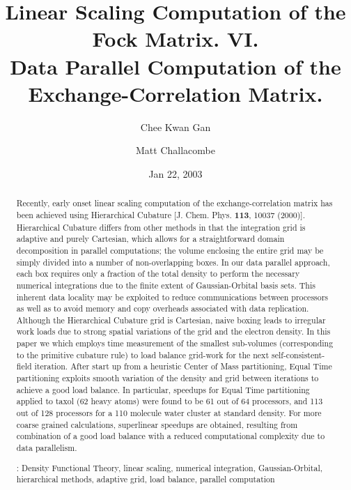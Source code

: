 \commentoutA{\documentclass[prl,aps,twocolumn,showpacs,twocolumngrid,superbib]{revtex4}}
\begin{document}
\title[Short Title]{ Linear Scaling Computation of the Fock Matrix. VI. \\ 
                     Data Parallel Computation of the Exchange-Correlation Matrix.\footnotemark[4] }

\author{Chee Kwan Gan\footnotemark[2]}
\author{Matt Challacombe\footnotemark[3]}
 


\date{Jan 22, 2003}

\begin{abstract}
Recently, early onset linear scaling computation of the
exchange-correlation matrix has been achieved using Hierarchical
Cubature [J. Chem. Phys. {\bf 113}, 10037 (2000)]. Hierarchical
Cubature differs from other methods in that the integration grid is
adaptive and purely Cartesian, which allows for a straightforward
domain decomposition in parallel computations; the volume enclosing
the entire grid may be simply divided into a number of non-overlapping
boxes. In our data parallel approach, each box requires only a fraction 
of the total density to perform the necessary numerical integrations
due to the finite extent of Gaussian-Orbital basis sets.  This inherent 
data locality may be exploited to reduce communications between processors 
as well as to avoid memory and copy overheads associated with data 
replication.  Although the Hierarchical Cubature grid is Cartesian, 
naive boxing leads to irregular work loads due to strong spatial variations 
of the grid and the electron density.  In this paper we
which employs time measurement of the smallest sub-volumes
(corresponding to the primitive cubature rule) to load balance
grid-work for the next self-consistent-field iteration.  After start
up from a heuristic Center of Mass partitioning, Equal Time
partitioning exploits smooth variation of the density and grid between
iterations to achieve a good load balance. In particular, speedups for
Equal Time partitioning applied to taxol (62 heavy atoms) were found
to be 61 out of 64 processors, and 113 out of 128 processors for a 110
molecule water cluster at standard density.  For more coarse grained
calculations, superlinear speedups are obtained, resulting from
combination of a good load balance with a reduced computational
complexity due to data parallelism.

\smallskip
{}: Density Functional Theory, linear scaling, numerical integration, Gaussian-Orbital, 
                         hierarchical methods, adaptive grid, load balance, parallel computation
\end{abstract}
\end{document}
